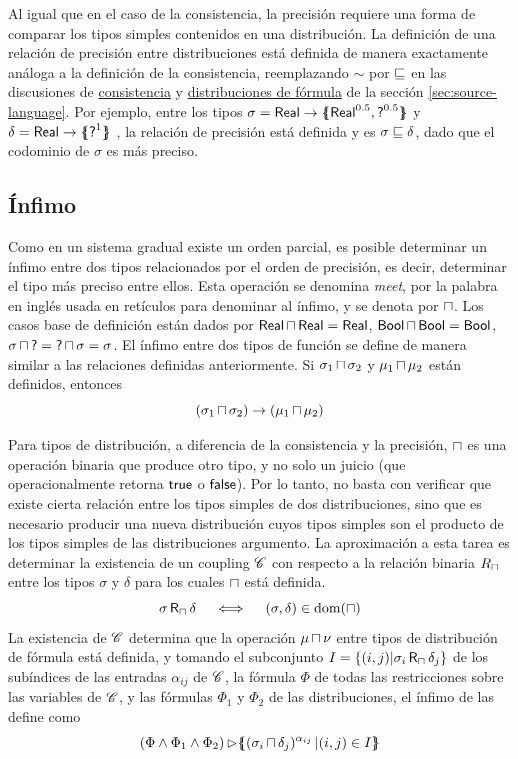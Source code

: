 Al igual que en el caso de la consistencia, la precisión requiere una forma de comparar los tipos simples contenidos en una distribución. La definición de una relación de precisión entre distribuciones está definida de manera exactamente análoga a la definición de la consistencia, reemplazando $\sim$ por $\sqsubseteq$ en las discusiones de \hyperref[par:consistency]{consistencia} y \hyperref[par:symbolic]{distribuciones de fórmula} de la sección \ref{sec:source-language}. Por ejemplo, entre los tipos $\sigma = \mathord{\text{\sffamily Real}} \to \{\mskip-7mu\{ {\mathord{\text{\sffamily Real}}^{0.5},\mathord{\text{\sffamily ?}}^{0.5}} \}\mskip-7mu\}$  y $\delta = \mathord{\text{\sffamily Real}} \to \{\mskip-7mu\{ {\mathord{\text{\sffamily ?}}^1} \}\mskip-7mu\}$ , la relación de precisión está definida y es $\sigma\sqsubseteq\delta$, dado que el codominio de $\sigma$ es más preciso.

\subsection{Ínfimo} Como en un sistema gradual existe un orden
parcial, es posible determinar un ínfimo entre dos tipos relacionados
por el orden de precisión, es decir, determinar el tipo más preciso
entre ellos. Esta operación se denomina \emph{meet}, por la palabra en
inglés usada en retículos para denominar al ínfimo, y se denota por
$\mathop{\sqcap}$.  Los casos base de definición están dados por $\mathord{\text{\sffamily Real}} \mathop{\sqcap} \mathord{\text{\sffamily Real}} = \mathord{\text{\sffamily Real}}$, $\mathord{\text{\sffamily Bool}} \mathop{\sqcap} \mathord{\text{\sffamily Bool}} = \mathord{\text{\sffamily Bool}}$, $\sigma \mathop{\sqcap} \mathord{\text{\sffamily ?}} = \mathord{\text{\sffamily ?}} \mathop{\sqcap} \sigma = \sigma$. El ínfimo entre dos tipos de función se define de manera similar a las relaciones definidas anteriormente. Si $\sigma_1\mathop{\sqcap}\sigma_2$ y $\mu_1 \mathop{\sqcap} \mu_2$ están definidos, entonces \[(\sigma_1\mathop{\sqcap}\sigma_2) \to (\mu_1 \mathop{\sqcap} \mu_2)\]

Para tipos de distribución, a diferencia de la consistencia y la precisión, $\mathop{\sqcap}$ es una operación binaria que produce otro tipo, y no solo un juicio (que operacionalmente retorna $\mathord{\text{\sffamily true}}$ o $\mathord{\text{\sffamily false}}$). Por lo tanto, no basta con verificar que existe cierta relación entre los tipos simples de dos distribuciones, sino que es necesario producir una nueva distribución cuyos tipos simples son el producto de los tipos simples de las distribuciones argumento. La aproximación a esta tarea es determinar la existencia de un coupling $\mathscr{C}$ con respecto a la relación binaria $R_{\mathop{\sqcap}}$ entre los tipos $\sigma$ y $\delta$ para los cuales $\mathop{\sqcap}$ está definida.
\[ \sigma \mathop{\text{\sffamily R}_{\mathop{\sqcap}}} \delta \quad \iff \quad {(\sigma,\delta)\in \operatorname{dom}(\mathop{\sqcap})}\]
La existencia de $\mathscr{C}$ determina que la operación $\mu \mathop{\sqcap} \nu$ entre tipos de distribución de fórmula está definida, y tomando el subconjunto $ I = \{ (i,j) |  \sigma_i \mathop{\text{\sffamily R}_{\mathop{\sqcap}}} \delta_j \}$ de los subíndices de las entradas $\alpha_{ij}$ de $\mathscr{C}$, la fórmula $\Phi$ de todas las restricciones sobre las variables de $\mathscr{C}$, y las fórmulas $\Phi_1$ y $\Phi_2$ de las distribuciones, el ínfimo de las  define como 
\[ (\Phi \land \Phi_1 \land \Phi_2) \mathop{\rhd} \{\mskip-7mu\{ { (\sigma_i \mathop{\sqcap} \delta_j) ^{\alpha_{ij}} \mathop{|} (i,j) \in I} \}\mskip-7mu\}  \]

